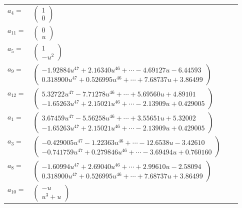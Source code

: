 \documentclass[1p]{elsarticle_modified}
\theoremstyle{definition}
\begin{document}
\begin{tabular}{m{7pt} m{180pt} m{7pt} m{180pt} }
\flushright $a_{4}=$&$\begin{pmatrix}1\\0\end{pmatrix}$ \\
\flushright $a_{11}=$&$\begin{pmatrix}0\\u\end{pmatrix}$ \\
\flushright $a_{5}=$&$\begin{pmatrix}1\\- u^2\end{pmatrix}$ \\
\flushright $a_{9}=$&$\begin{pmatrix}-1.92884 u^{47}+2.16340 u^{46}+\cdots-4.69127 u-6.44593\\0.318900 u^{47}+0.526995 u^{46}+\cdots+7.68737 u+3.86499\end{pmatrix}$ \\
\flushright $a_{12}=$&$\begin{pmatrix}5.32722 u^{47}-7.71278 u^{46}+\cdots+5.69560 u+4.89101\\-1.65263 u^{47}+2.15021 u^{46}+\cdots-2.13909 u+0.429005\end{pmatrix}$ \\
\flushright $a_{1}=$&$\begin{pmatrix}3.67459 u^{47}-5.56258 u^{46}+\cdots+3.55651 u+5.32002\\-1.65263 u^{47}+2.15021 u^{46}+\cdots-2.13909 u+0.429005\end{pmatrix}$ \\
\flushright $a_{3}=$&$\begin{pmatrix}-0.429005 u^{47}-1.22363 u^{46}+\cdots-12.6538 u-3.42610\\-0.741759 u^{47}+0.279846 u^{46}+\cdots-3.69494 u+0.760160\end{pmatrix}$ \\
\flushright $a_{8}=$&$\begin{pmatrix}-1.60994 u^{47}+2.69040 u^{46}+\cdots+2.99610 u-2.58094\\0.318900 u^{47}+0.526995 u^{46}+\cdots+7.68737 u+3.86499\end{pmatrix}$ \\
\flushright $a_{10}=$&$\begin{pmatrix}- u\\u^3+u\end{pmatrix}$ \\

\end{tabular}
\end{document}
